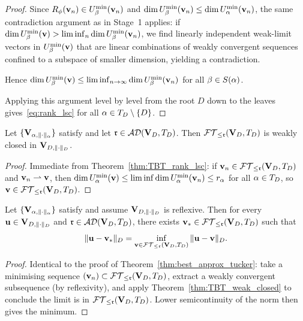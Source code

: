 \begin{proof}
Since $R_\phi(\mathbf{v}_n) \in U^{\min}_{\beta}(\mathbf{v}_n)$ and
$\dim U^{\min}_{\beta}(\mathbf{v}_n) \leq \dim U^{\min}_{\alpha}(\mathbf{v}_n)$, the same
contradiction argument as in Stage~1 applies: if
$\dim U^{\min}_{\beta}(\mathbf{v}) > \liminf_n \dim U^{\min}_{\beta}(\mathbf{v}_n)$, we
find linearly independent weak-limit vectors in $U^{\min}_{\beta}(\mathbf{v})$
that are linear combinations of weakly convergent sequences confined
to a subspace of smaller dimension, yielding a contradiction.

Hence $\dim U^{\min}_{\beta}(\mathbf{v}) \leq \liminf_{n \to \infty}
\dim U^{\min}_{\beta}(\mathbf{v}_n)$ for all $\beta \in S(\alpha)$.

Applying this argument level by level from the root $D$ down to the
leaves gives~\eqref{eq:rank_lsc} for all $\alpha \in T_D \setminus \{D\}$.
\end{proof}

\begin{theorem}
\label{thm:TBT_weak_closed}
Let $\{\mathbf{V}_{\alpha,\|\cdot\|_\alpha}\}$ satisfy \condINJ[$T_D$] and let
$\mathfrak{r} \in \mathcal{AD}(\mathbf{V}_D,T_D)$. Then $\mathcal{FT}_{\leq \mathfrak{r}}(\mathbf{V}_D,T_D)$ is weakly closed
in $\mathbf{V}_{D,\|\cdot\|_D}$.
\end{theorem}

\begin{proof}
Immediate from Theorem~\ref{thm:TBT_rank_lsc}: if $\mathbf{v}_n \in
\mathcal{FT}_{\leq \mathfrak{r}}(\mathbf{V}_D,T_D)$ and $\mathbf{v}_n \rightharpoonup \mathbf{v}$, then
$\dim U^{\min}_{\alpha}(\mathbf{v}) \leq \liminf \dim U^{\min}_{\alpha}(\mathbf{v}_n)
\leq r_\alpha$ for all $\alpha \in T_D$, so $\mathbf{v} \in
\mathcal{FT}_{\leq \mathfrak{r}}(\mathbf{V}_D,T_D)$.
\end{proof}

\begin{theorem}
\label{thm:TBT_best_approx}
Let $\{\mathbf{V}_{\alpha,\|\cdot\|_\alpha}\}$ satisfy \condINJ[$T_D$] and assume $\mathbf{V}_{D,\|\cdot\|_D}$
is reflexive. Then for every $\mathbf{u} \in \mathbf{V}_{D,\|\cdot\|_D}$ and $\mathfrak{r} \in \mathcal{AD}(\mathbf{V}_D,T_D)$,
there exists $\mathbf{v}_* \in \mathcal{FT}_{\leq \mathfrak{r}}(\mathbf{V}_D,T_D)$ such that
\begin{equation}
\label{eq:TBT_best_approx}
    \|\mathbf{u} - \mathbf{v}_*\|_D =
    \inf_{\mathbf{v} \in \mathcal{FT}_{\leq \mathfrak{r}}(\mathbf{V}_D,T_D)} \|\mathbf{u} - \mathbf{v}\|_D.
\end{equation}
\end{theorem}

\begin{proof}
Identical to the proof of Theorem~\ref{thm:best_approx_tucker}:
take a minimising sequence $(\mathbf{v}_n) \subset \mathcal{FT}_{\leq \mathfrak{r}}(\mathbf{V}_D,T_D)$,
extract a weakly convergent subsequence (by reflexivity), and apply
Theorem~\ref{thm:TBT_weak_closed} to conclude the limit is in
$\mathcal{FT}_{\leq \mathfrak{r}}(\mathbf{V}_D,T_D)$. Lower semicontinuity of the norm then gives
the minimum.
\end{proof}


